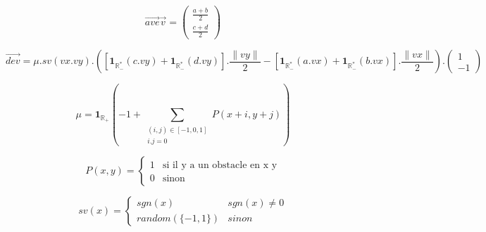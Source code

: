 \documentclass[10pt]{article}
\begin{document}
\[\overrightarrow{ave}\overrightarrow{v} = 
\begin{pmatrix}
\frac{a+b}{2} \\
\frac{c+d}{2}
\end{pmatrix}
\]

\[\overrightarrow{dev} = \mu.sv(vx.vy).([\mathbf{1}_{\mathbb{R_-^*}}(c.vy)+\mathbf{1}_{\mathbb{R_-^*}}(d.vy)].\frac{\|vy\|}{2}-[\mathbf{1}_{\mathbb{R_-^*}}(a.vx)+\mathbf{1}_{\mathbb{R_-^*}}(b.vx)].\frac{\|vx\|}{2}).
\begin{pmatrix}
1 \\
-1
\end{pmatrix}
\]

\[\mu = \mathbf{1}_{\mathbb{R_+}}(-1+\sum_{\substack{(i,j)\in[-1,0,1]\\i.j=0}}{P(x+i,y+j)})\]

\[ P(x,y) = 
\begin{cases}
	1 & \text{si il y a un obstacle en x y} \\
	0 & \text{sinon}
\end{cases}
\]

\[sv(x) = 
\begin{cases}
	sgn(x) & sgn(x) \neq 0 \\
	random(\{-1,1\}) & sinon
\end{cases}
\]
\end{document}
